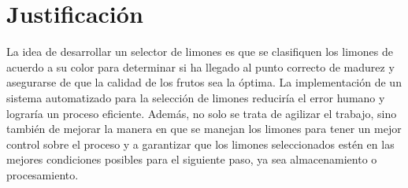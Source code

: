 \section{Justificación}

La idea de desarrollar un selector de limones es que se clasifiquen los limones de acuerdo a su color para determinar si ha llegado al punto correcto de madurez y asegurarse de que la calidad de los frutos sea la óptima. La implementación de un sistema automatizado para la selección de limones reduciría el error humano y lograría un proceso eficiente. 
Además, no solo se trata de agilizar el trabajo, sino también de mejorar la manera en que se manejan los limones para tener un mejor control sobre el proceso y a garantizar que los limones seleccionados estén en las mejores condiciones posibles para el siguiente paso, ya sea almacenamiento o procesamiento.
